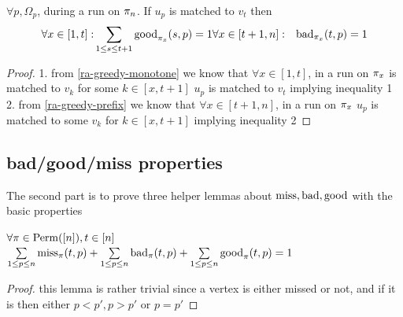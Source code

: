 \begin{lemma}[Partitioning]
	\label{ra-greedy-partition}
	$\forall p,\Omega_p$, during a run on $\pi_n$. If $u_p$ is matched to $v_t$ then
	\begin{align}
		\forall x\in[1,t]: & \sum\limits_{1\leq s\leq t+1} \mathrm{good}_{\pi_x}(s,p)=1
		\forall x\in[t+1,n]: & \mathrm{bad}_{\pi_x}(t,p)=1
	\end{align}
\end{lemma}

\begin{proof}
	1. from \autoref{ra-greedy-monotone} we know that $\forall x\in[1,t]$, in a run on $\pi_x$ is matched to $v_k$ for some $k\in[x,t+1]$ $u_p$ is matched to $v_t$ implying inequality 1
	2. from \autoref{ra-greedy-prefix} we know that $\forall x\in[t+1,n]$, in a run on $\pi_x$ $u_p$ is matched to some $v_k$ for $k\in[x,t+1]$ implying inequality 2
\end{proof}

\subsection{bad/good/miss properties}

The second part is to prove three helper lemmas about $\mathrm{miss},\mathrm{bad},\mathrm{good}$ with the basic properties

\begin{lemma}
	\label{ra-greedy-bgm-1}
	$\forall\pi\in\mathrm{Perm}([n]),t\in[n]$\\
	$\sum\limits_{1\leq p\leq n}\mathrm{miss}_{\pi}(t,p)+\sum\limits_{1\leq p\leq n}\mathrm{bad}_{\pi}(t,p)+\sum\limits_{1\leq p\leq n}\mathrm{good}_{\pi}(t,p)=1$
\end{lemma}
\begin{proof}
	this lemma is rather trivial since a vertex is either missed or not, and if it is then either $p<p',p>p'$ or $p=p'$
\end{proof}

